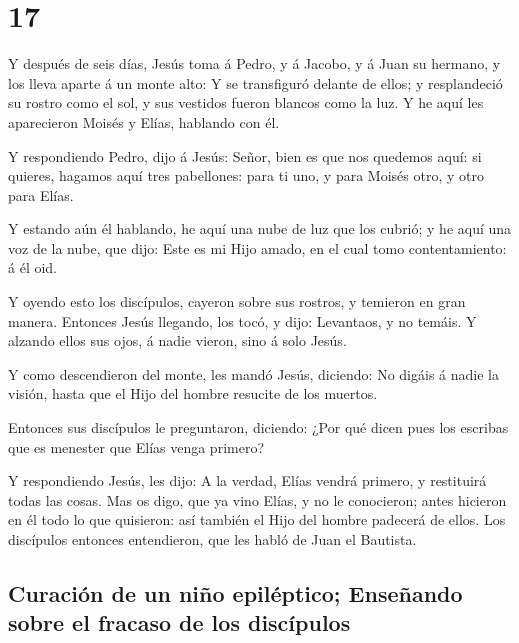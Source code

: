 \hypertarget{section-16}{%
\section{17}\label{section-16}}

 Y después de seis días, Jesús toma á Pedro, y á Jacobo, y
á Juan su hermano, y los lleva aparte á un monte alto:  Y
se transfiguró delante de ellos; y resplandeció su rostro como el sol, y
sus vestidos fueron blancos como la luz.  Y he aquí les
aparecieron Moisés y Elías, hablando con él.

 Y respondiendo Pedro, dijo á Jesús: Señor, bien es que
nos quedemos aquí: si quieres, hagamos aquí tres pabellones: para ti
uno, y para Moisés otro, y otro para Elías.

 Y estando aún él hablando, he aquí una nube de luz que
los cubrió; y he aquí una voz de la nube, que dijo: Este es mi Hijo
amado, en el cual tomo contentamiento: á él oid.

 Y oyendo esto los discípulos, cayeron sobre sus rostros,
y temieron en gran manera.  Entonces Jesús llegando, los
tocó, y dijo: Levantaos, y no temáis.  Y alzando ellos sus
ojos, á nadie vieron, sino á solo Jesús.

 Y como descendieron del monte, les mandó Jesús, diciendo:
No digáis á nadie la visión, hasta que el Hijo del hombre resucite de
los muertos.

 Entonces sus discípulos le preguntaron, diciendo: ¿Por
qué dicen pues los escribas que es menester que Elías venga primero?

 Y respondiendo Jesús, les dijo: A la verdad, Elías
vendrá primero, y restituirá todas las cosas.  Mas os
digo, que ya vino Elías, y no le conocieron; antes hicieron en él todo
lo que quisieron: así también el Hijo del hombre padecerá de ellos.
 Los discípulos entonces entendieron, que les habló de
Juan el Bautista.

\hypertarget{curaciuxf3n-de-un-niuxf1o-epiluxe9ptico-enseuxf1ando-sobre-el-fracaso-de-los-discuxedpulos}{%
\subsection{Curación de un niño epiléptico; Enseñando sobre el fracaso
de los
discípulos}\label{curaciuxf3n-de-un-niuxf1o-epiluxe9ptico-enseuxf1ando-sobre-el-fracaso-de-los-discuxedpulos}}

